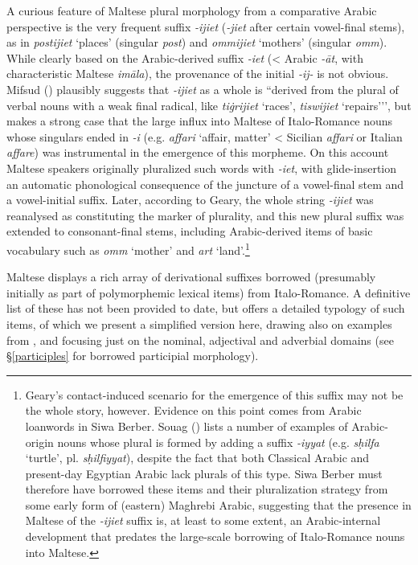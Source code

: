 \documentclass[output=paper]{langsci/langscibook}
\begin{document}
A curious feature of Maltese plural morphology from a comparative Arabic perspective is the very frequent suffix \textit{-ijiet} (\textit{-jiet} after certain vowel-final stems), as in \textit{postijiet} `places' (singular \textit{post}) and \textit{ommijiet} `mothers' (singular \textit{omm}). While clearly based on the Arabic-derived suffix \textit{-iet} (< Arabic \textit{-\={a}t}, with characteristic Maltese \textit{im\={a}la}), the provenance of the initial \textit{-ij-} is not obvious. Mifsud (\citeyear{mifsud2011}) plausibly suggests that \textit{-ijiet} as a whole is ``derived from the plural of verbal nouns with a weak final radical, like \textit{tiġrijiet} `races', \textit{tiswijiet} `repairs’'', but \cite{geary2017} makes a strong case that the large influx into Maltese of Italo-Romance nouns whose singulars ended in \textit{-i} (e.g. \textit{affari} `affair, matter' < Sicilian \textit{affari} or Italian \textit{affare}) was instrumental in the emergence of this morpheme. On this account Maltese speakers originally pluralized such words with \textit{-iet}, with glide-insertion an automatic phonological consequence of the juncture of a vowel-final stem and a vowel-initial suffix. Later, according to Geary, the whole string \textit{-ijiet} was reanalysed as constituting the marker of plurality, and this new plural suffix was extended to consonant-final stems, including Arabic-derived items of basic vocabulary such as \textit{omm} `mother' and \textit{art} `land'.\footnote{Geary's contact-induced scenario for the emergence of this suffix may not be the whole story, however. Evidence on this point comes from Arabic loanwords in Siwa Berber. Souag (\citeyear[74]{Souag2013book}) lists a number of examples of Arabic-origin nouns whose plural is formed by adding a suffix \textit{-iyyat} (e.g. \textit{sḥilfa} `turtle', pl. \textit{sḥilfiyyat}), despite the fact that both Classical Arabic and present-day Egyptian Arabic lack plurals of this type. Siwa Berber must therefore have borrowed these items and their pluralization strategy from some early form of (eastern) Maghrebi Arabic, suggesting that the presence in Maltese of the \textit{-ijiet} suffix is, at least to some extent, an Arabic-internal development that predates the large-scale borrowing of Italo-Romance nouns into Maltese.} %

Maltese displays a rich array of derivational suffixes borrowed (presumably initially as part of polymorphemic lexical items) from Italo-Romance. A definitive list of these has not been provided to date, but \cite{Saade2019} offers a detailed typology of such items, of which we present a simplified version here, drawing also on examples from \cite{brincatmifsud2015}, and focusing just on the nominal, adjectival and adverbial domains (see §\ref{participles} for borrowed participial morphology). 
\end{document}
